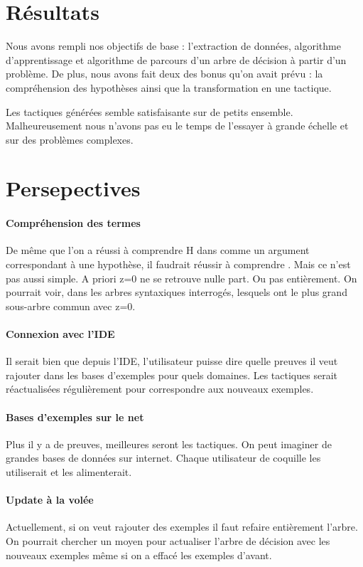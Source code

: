 \section{Résultats}
Nous avons rempli nos objectifs de base : l'extraction de données, algorithme d'apprentissage et algorithme de parcours d'un arbre de décision à partir d'un problème. De plus, nous avons fait deux des bonus qu'on avait prévu : la compréhension des hypothèses ainsi que la transformation en une tactique.

Les tactiques générées semble satisfaisante sur de petits ensemble. Malheureusement nous n'avons pas eu le temps de l'essayer à grande échelle et sur des problèmes complexes. 


\section{Persepectives}
\paragraph{Compréhension des termes} De même que l'on a réussi à comprendre H dans  comme un argument correspondant à une hypothèse, il faudrait réussir à comprendre . Mais ce n'est pas aussi simple. A priori z=0 ne se retrouve nulle part. Ou pas entièrement. On pourrait voir, dans les arbres syntaxiques interrogés, lesquels ont le plus grand sous-arbre commun avec z=0.

\paragraph{Connexion avec l'IDE} Il serait bien que depuis l'IDE, l'utilisateur puisse dire quelle preuves il veut rajouter dans les bases d'exemples pour quels domaines. Les tactiques serait réactualisées régulièrement pour correspondre aux nouveaux exemples.

\paragraph{Bases d'exemples sur le net} Plus il y a de preuves, meilleures seront les tactiques. On peut imaginer de grandes bases de données sur internet. Chaque utilisateur de coquille les utiliserait et les alimenterait.

\paragraph{Update à la volée} Actuellement, si on veut rajouter des exemples il faut refaire entièrement l'arbre. On pourrait chercher un moyen pour actualiser l'arbre de décision avec les nouveaux exemples même si on a effacé les exemples d'avant.

